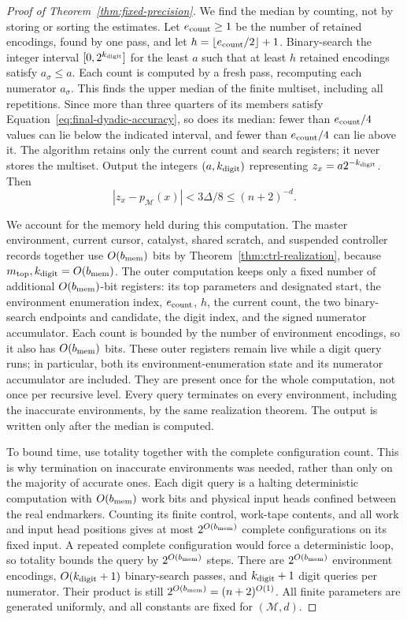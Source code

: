 \documentclass[11pt]{article}
\numberwithin{equation}{section}
\theoremstyle{definition}
\theoremstyle{remark}
\begin{document}
\begin{proof}[Proof of Theorem~\ref{thm:fixed-precision}]
We find the median by counting, not by storing or sorting the estimates. Let ${e_{\rm count}}\ge1$ be the number of retained encodings, found by one pass,
and let $h=\lfloor {e_{\rm count}}/2\rfloor+1$. Binary-search the integer interval
$[0,2^{k_{\rm digit}}]$ for the least $a$ such that at least $h$ retained encodings
satisfy $a_\sigma\le a$. Each count is computed by a fresh pass,
recomputing each numerator $a_\sigma$. This finds the upper median
of the finite multiset, including all repetitions. Since more than
three quarters of its members satisfy
Equation~\eqref{eq:final-dyadic-accuracy}, so does its median: fewer than
${e_{\rm count}}/4$ values can lie below the indicated interval, and fewer than
${e_{\rm count}}/4$ can lie above it. The algorithm retains only the current count
and search registers; it never stores the multiset.
Output the integers $(a,{k_{\rm digit}})$ representing $z_x=a2^{-{k_{\rm digit}}}$. Then
\[
 |z_x-p_{\mathcal M}(x)|<3\Delta/8
       \le(n+2)^{-d}.
\]

We account for the memory held during this computation. The master
environment, current cursor, catalyst, shared scratch, and suspended
controller records together use $O({b_{\rm mem}})$ bits by
Theorem~\ref{thm:ctrl-realization}, because ${m}_{\mathrm{top}},{k_{\rm digit}}=O({b_{\rm mem}})$.
The outer computation keeps only a fixed number of additional
$O({b_{\rm mem}})$-bit registers: its top parameters and designated start,
the environment enumeration index, ${e_{\rm count}}$, $h$, the current count,
the two binary-search endpoints and candidate, the digit index,
and the signed numerator accumulator. Each count is bounded by the
number of environment encodings, so it also has $O({b_{\rm mem}})$ bits.
These outer registers remain live while a digit query runs; in
particular, both its environment-enumeration state and its numerator
accumulator are included. They are present once for the whole
computation, not once per recursive level. Every query terminates on every environment,
including the inaccurate environments, by the same realization
theorem. The output is written only after the median is computed.

To bound time, use totality together with the complete configuration count. This is why termination on inaccurate environments was needed, rather than only on the majority of accurate ones. Each digit query is a halting deterministic computation with $O({b_{\rm mem}})$
work bits and physical input heads confined between the real endmarkers.
Counting its finite control, work-tape contents, and all work and input
head positions gives at most $2^{O({b_{\rm mem}})}$ complete configurations on its
fixed input. A repeated complete configuration would
force a deterministic loop, so totality bounds the query by
$2^{O({b_{\rm mem}})}$ steps. There are
$2^{O({b_{\rm mem}})}$ environment encodings, $O({k_{\rm digit}}+1)$ binary-search passes,
and ${k_{\rm digit}}+1$ digit queries per numerator. Their product is still
$2^{O({b_{\rm mem}})}=(n+2)^{O(1)}$. All finite parameters are generated
uniformly, and all constants are fixed for $(\mathcal M,d)$.
\end{proof}
\end{document}
